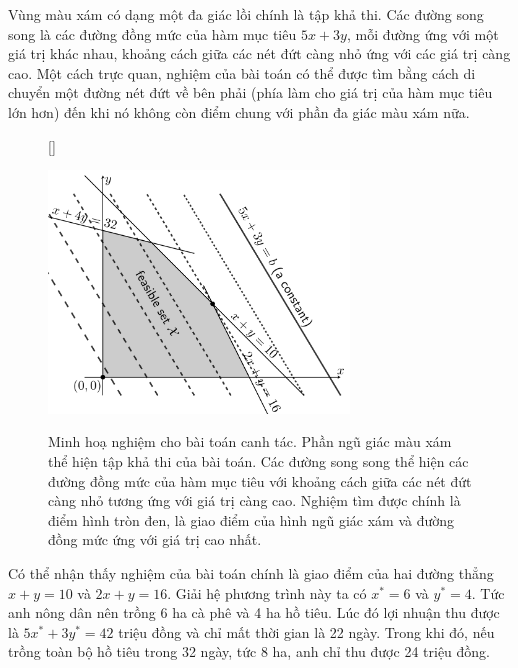 Vùng màu xám có dạng một đa giác lồi chính
là tập khả thi. Các đường song song là các
đường {đồng mức} của hàm mục tiêu $5x + 3y$, mỗi
đường ứng với một giá trị khác nhau, khoảng cách giữa các nét đứt càng nhỏ
ứng với các giá trị càng cao. Một cách trực quan, nghiệm của bài toán có thể được tìm bằng cách di chuyển một đường nét đứt về bên phải (phía làm cho
giá trị của hàm mục tiêu lớn hơn) đến khi nó không còn điểm chung với phần đa
giác màu xám nữa.
\begin{figure}[t]
    [\FBwidth]
    {\caption{Minh hoạ nghiệm cho bài toán canh tác. Phần ngũ giác màu xám thể
    hiện tập khả thi của bài toán. Các đường song song thể hiện
    các đường đồng mức của hàm mục tiêu với khoảng cách giữa các nét đứt càng
    nhỏ tương ứng với giá trị càng cao. Nghiệm tìm được chính là điểm hình tròn
    đen, là giao điểm của hình ngũ giác xám và đường đồng mức ứng với giá trị
    cao nhất.}
    \label{fig:16_lp1}}
    {\includegraphics[width=8cm]{Chapters/08_ConvexOptimization/17_convexopt/latex/planting.pdf}}
\end{figure}
 
Có thể nhận thấy nghiệm của bài toán chính là giao điểm của hai đường thẳng $x +
y = 10$ và $2x + y = 16$. Giải hệ phương trình này ta có $x^* = 6$ và $y^* = 4$.
Tức anh nông dân nên trồng 6 ha cà phê và 4 ha hồ tiêu. Lúc đó lợi nhuận thu được
là $5x^* + 3y^* = 42 $ triệu đồng và chỉ mất thời gian là 22 ngày.
Trong khi đó, nếu trồng toàn bộ hồ tiêu trong 32 ngày, tức 8 ha, anh chỉ thu được
24 triệu đồng.
 
